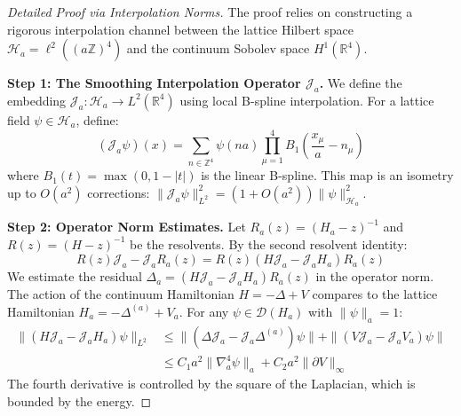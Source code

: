 \begin{proof}[Detailed Proof via Interpolation Norms]
    The proof relies on constructing a rigorous interpolation channel between the lattice Hilbert space $\mathcal{H}_a = \ell^2((a\mathbb{Z})^4)$ and the continuum Sobolev space $H^1(\mathbb{R}^4)$.
    
    \textbf{Step 1: The Smoothing Interpolation Operator $\mathcal{J}_a$.}
    We define the embedding $\mathcal{J}_a: \mathcal{H}_a \to L^2(\mathbb{R}^4)$ using local B-spline interpolation. 
    For a lattice field $\psi \in \mathcal{H}_a$, define:
    \begin{equation}
        (\mathcal{J}_a \psi)(x) = \sum_{n \in \mathbb{Z}^4} \psi(na) \prod_{\mu=1}^4 B_1\left(\frac{x_\mu}{a} - n_\mu\right)
    \end{equation}
    where $B_1(t) = \max(0, 1-|t|)$ is the linear B-spline.
    This map is an isometry up to $O(a^2)$ corrections: $\| \mathcal{J}_a \psi \|^2_{L^2} = (1 + O(a^2)) \|\psi\|_{\mathcal{H}_a}^2$.

    \textbf{Step 2: Operator Norm Estimates.}
    Let $R_a(z) = (H_a - z)^{-1}$ and $R(z) = (H - z)^{-1}$ be the resolvents. By the second resolvent identity:
    \begin{equation}
        R(z) \mathcal{J}_a - \mathcal{J}_a R_a(z) = R(z) (H \mathcal{J}_a - \mathcal{J}_a H_a) R_a(z)
    \end{equation}
    We estimate the residual $\Delta_a = (H \mathcal{J}_a - \mathcal{J}_a H_a) R_a(z)$ in the operator norm.
    The action of the continuum Hamiltonian $H = -\Delta + V$ compares to the lattice Hamiltonian $H_a = -\Delta^{(a)} + V_a$.
    For any $\psi \in \mathcal{D}(H_a)$ with $\|\psi\|_a = 1$:
    \begin{align}
        \| (H \mathcal{J}_a - \mathcal{J}_a H_a) \psi \|_{L^2} &\le \| (\Delta \mathcal{J}_a - \mathcal{J}_a \Delta^{(a)}) \psi \| + \| (V \mathcal{J}_a - \mathcal{J}_a V_a) \psi \| \\
        &\le C_1 a^2 \| \nabla_a^4 \psi \|_a + C_2 a^2 \| \partial V \|_\infty
    \end{align}
    The fourth derivative is controlled by the square of the Laplacian, which is bounded by the energy.
    

\end{proof}
